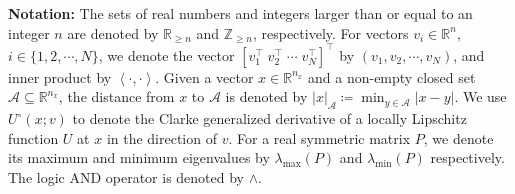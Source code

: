 \textbf{Notation:} The sets of real numbers and integers larger than or equal to an integer $n$ are denoted by $\mathbb{R}_{\geq n}$ and $\mathbb{Z}_{\geq n}$, respectively. 
%
%
For vectors $v_i\in \mathbb{R}^n$, $i\in \{1,2,\cdots, N\}$, we denote the vector $[v_1^\top \; v_2^\top \; \cdots \; v_N^\top]^\top$ by $(v_1, v_2, \cdots, v_N)$, and inner product by $\left< \cdot , \cdot \right>$. 
%
Given a vector $x\in \mathbb{R}^{n_x}$ and a non-empty closed set $\mathcal{A} \subseteq \mathbb{R}^{n_x}$, the distance from $x$ to $\mathcal{A}$ is denoted by $|x|_\mathcal{A} \coloneqq \min_{y\in \mathcal{A}}|x-y|$.
We use $U^\circ(x;v)$ to denote the Clarke generalized derivative \cite[Eqn. (20)]{teel2000assigning} of a locally Lipschitz function $U$ at $x$ in the direction of $v$. 
%
For a real symmetric matrix $P$, we denote its maximum and minimum eigenvalues by $\lambda_{\text{max}}(P)$ and $\lambda_{\text{min}}(P)$ respectively. The logic AND operator is denoted by $\wedge$.


